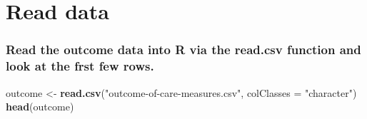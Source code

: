 \documentclass[
]{article}
\newenvironment{Shaded}{\begin{snugshade}}{\end{snugshade}}
\newcommand{\DataTypeTok}[1]{\textcolor[rgb]{0.13,0.29,0.53}{#1}}
\newcommand{\KeywordTok}[1]{\textcolor[rgb]{0.13,0.29,0.53}{\textbf{#1}}}
\newcommand{\NormalTok}[1]{#1}
\newcommand{\StringTok}[1]{\textcolor[rgb]{0.31,0.60,0.02}{#1}}
\begin{document}
\hypertarget{read-data}{%
\section{Read data}\label{read-data}}

\hypertarget{read-the-outcome-data-into-r-via-the-read.csv-function-and-look-at-the-frst-few-rows.}{%
\subsubsection{Read the outcome data into R via the read.csv function
and look at the frst few
rows.}\label{read-the-outcome-data-into-r-via-the-read.csv-function-and-look-at-the-frst-few-rows.}}

\begin{Shaded}
\begin{Highlighting}[]
\NormalTok{outcome <-}\StringTok{ }\KeywordTok{read.csv}\NormalTok{(}\StringTok{"outcome-of-care-measures.csv"}\NormalTok{, }\DataTypeTok{colClasses =} \StringTok{"character"}\NormalTok{)}
\KeywordTok{head}\NormalTok{(outcome)}
\end{Highlighting}
\end{Shaded}
\end{document}
